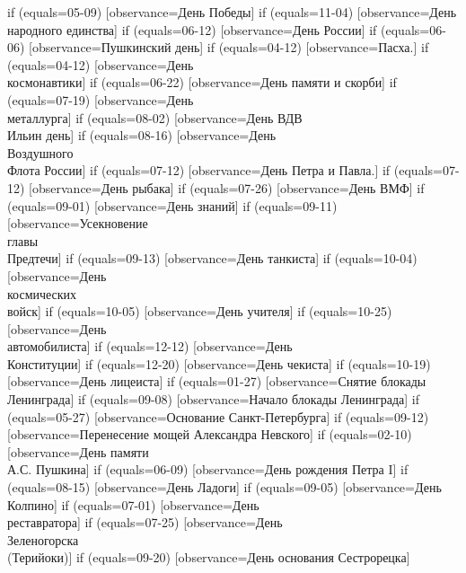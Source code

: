{  if (equals=05-09) [observance=День Победы]
  if (equals=11-04) [observance=День народного единства]
  if (equals=06-12) [observance=День России]
  if (equals=06-06) [observance=Пушкинский день]
  if (equals=04-12) [observance=Пасха.]
  if (equals=04-12) [observance=День\\ космонавтики]
  if (equals=06-22) [observance=День памяти и скорби]
  if (equals=07-19) [observance=День\\ металлурга]
  if (equals=08-02) [observance=День ВДВ\\ Ильин день]
  if (equals=08-16) [observance=День\\ Воздушного\\ Флота России]
  if (equals=07-12) [observance=День Петра и Павла.]
  if (equals=07-12) [observance=День рыбака]
  if (equals=07-26) [observance=День ВМФ]
  if (equals=09-01) [observance=День знаний]
  if (equals=09-11) [observance=Усекновение\\ главы\\ Предтечи]
  if (equals=09-13) [observance=День танкиста]
  if (equals=10-04) [observance=День\\ космических\\ войск]
  if (equals=10-05) [observance=День учителя]
  if (equals=10-25) [observance=День\\ автомобилиста]
  if (equals=12-12) [observance=День\\ Конституции]
  if (equals=12-20) [observance=День чекиста]
  if (equals=10-19) [observance=День лицеиста]
  if (equals=01-27) [observance=Снятие блокады Ленинграда]
  if (equals=09-08) [observance=Начало блокады Ленинграда]
  if (equals=05-27) [observance=Основание Санкт-Петербурга]
  if (equals=09-12) [observance=Перенесение мощей Александра Невского]
  if (equals=02-10) [observance=День памяти\\ А.С. Пушкина]
  if (equals=06-09) [observance=День рождения Петра I]
  if (equals=08-15) [observance=День Ладоги]
  if (equals=09-05) [observance=День Колпино]
  if (equals=07-01) [observance=День\\ реставратора]
  if (equals=07-25) [observance=День\\ Зеленогорска\\ (Терийоки)]
  if (equals=09-20) [observance=День основания Сестрорецка]
}
